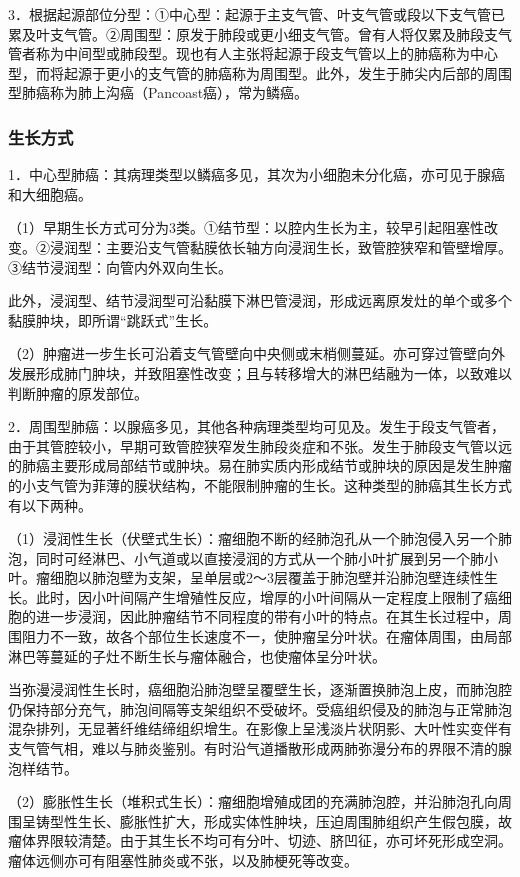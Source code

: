 3．根据起源部位分型：①中心型：起源于主支气管、叶支气管或段以下支气管已累及叶支气管。②周围型：原发于肺段或更小细支气管。曾有人将仅累及肺段支气管者称为中间型或肺段型。现也有人主张将起源于段支气管以上的肺癌称为中心型，而将起源于更小的支气管的肺癌称为周围型。此外，发生于肺尖内后部的周围型肺癌称为肺上沟癌（Pancoast癌），常为鳞癌。

\subsubsection{生长方式}

1．中心型肺癌：其病理类型以鳞癌多见，其次为小细胞未分化癌，亦可见于腺癌和大细胞癌。

（1）早期生长方式可分为3类。①结节型：以腔内生长为主，较早引起阻塞性改变。②浸润型：主要沿支气管黏膜依长轴方向浸润生长，致管腔狭窄和管壁增厚。③结节浸润型：向管内外双向生长。

此外，浸润型、结节浸润型可沿黏膜下淋巴管浸润，形成远离原发灶的单个或多个黏膜肿块，即所谓“跳跃式”生长。

（2）肿瘤进一步生长可沿着支气管壁向中央侧或末梢侧蔓延。亦可穿过管壁向外发展形成肺门肿块，并致阻塞性改变；且与转移增大的淋巴结融为一体，以致难以判断肿瘤的原发部位。

2．周围型肺癌：以腺癌多见，其他各种病理类型均可见及。发生于段支气管者，由于其管腔较小，早期可致管腔狭窄发生肺段炎症和不张。发生于肺段支气管以远的肺癌主要形成局部结节或肿块。易在肺实质内形成结节或肿块的原因是发生肿瘤的小支气管为菲薄的膜状结构，不能限制肿瘤的生长。这种类型的肺癌其生长方式有以下两种。

（1）浸润性生长（伏壁式生长）：瘤细胞不断的经肺泡孔从一个肺泡侵入另一个肺泡，同时可经淋巴、小气道或以直接浸润的方式从一个肺小叶扩展到另一个肺小叶。瘤细胞以肺泡壁为支架，呈单层或2～3层覆盖于肺泡壁并沿肺泡壁连续性生长。此时，因小叶间隔产生增殖性反应，增厚的小叶间隔从一定程度上限制了癌细胞的进一步浸润，因此肿瘤结节不同程度的带有小叶的特点。在其生长过程中，周围阻力不一致，故各个部位生长速度不一，使肿瘤呈分叶状。在瘤体周围，由局部淋巴等蔓延的子灶不断生长与瘤体融合，也使瘤体呈分叶状。

当弥漫浸润性生长时，癌细胞沿肺泡壁呈覆壁生长，逐渐置换肺泡上皮，而肺泡腔仍保持部分充气，肺泡间隔等支架组织不受破坏。受癌组织侵及的肺泡与正常肺泡混杂排列，无显著纤维结缔组织增生。在影像上呈浅淡片状阴影、大叶性实变伴有支气管气相，难以与肺炎鉴别。有时沿气道播散形成两肺弥漫分布的界限不清的腺泡样结节。

（2）膨胀性生长（堆积式生长）：瘤细胞增殖成团的充满肺泡腔，并沿肺泡孔向周围呈铸型性生长、膨胀性扩大，形成实体性肿块，压迫周围肺组织产生假包膜，故瘤体界限较清楚。由于其生长不均可有分叶、切迹、脐凹征，亦可坏死形成空洞。瘤体远侧亦可有阻塞性肺炎或不张，以及肺梗死等改变。

